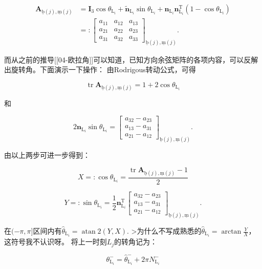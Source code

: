\[
\begin{aligned}
\boldsymbol{A}_{\underline{\mathrm{b}}(j), \underline{\mathrm{m}}(j)} & =\boldsymbol{I}_{3} \cos \theta_{\mathrm{L}_{i}}+\tilde{\boldsymbol{n}}_{\mathrm{L}_{i}} \sin \theta_{\mathrm{L}_{i}}+\boldsymbol{n}_{\mathrm{L}_{i}} \boldsymbol{n}_{\mathrm{L}_{i}}^{\mathrm{T}}\left(1-\cos \theta_{\mathrm{L}_{i}}\right) \\
& =:\left[\begin{array}{lll}
a_{11} & a_{12} & a_{13} \\
a_{21} & a_{22} & a_{23} \\
a_{31} & a_{32} & a_{33}
\end{array}\right]_{\underline{\mathrm{b}}(j), \underline{\mathrm{m}}(j)} .
\end{aligned}
\]

而从之前的推导[[04-欧拉角]]可以知道，已知方向余弦矩阵的各项内容，可以反解出旋转角。下面演示一下操作： 由Rodrigous转动公式，可得

\[
\operatorname{tr} \boldsymbol{A}_{\underline{\mathrm{b}}(j), \underline{\mathrm{m}}(j)}=1+2 \cos \theta_{\mathrm{L}_{i}}
\]

和

\[
2 \boldsymbol{n}_{\mathrm{L}_{i}} \sin \theta_{\mathrm{L}_{i}}=\left[\begin{array}{c}
a_{32}-a_{23} \\
a_{13}-a_{31} \\
a_{21}-a_{12}
\end{array}\right]_{\underline{\mathrm{b}}(j), \underline{\mathrm{m}}(j)} .
\]

由以上两步可进一步得到：

\[
X=:\cos\theta_{\mathrm{L}_{i}}=\frac{\operatorname{tr} \boldsymbol{A}_{\underline{\mathrm{b}}(j), \underline{\mathrm{m}}(j)}-1}{2}
\]

\[
Y=: \sin \theta_{\mathrm{L}_{i}}=\frac{1}{2} \boldsymbol{n}_{\mathrm{L}_{i}}^{\mathrm{T}}\left[\begin{array}{l}
a_{32}-a_{23} \\
a_{13}-a_{31} \\
a_{21}-a_{12}
\end{array}\right]_{\underline{\mathrm{b}}(j), \underline{\mathrm{m}}(j)} .
\]

在$(-\pi,\pi]$区间内有$\hat{\theta}_{\mathrm{L}_{i}}=\operatorname{atan} 2(Y, X) .$
>为什么不写成熟悉的$\hat{\theta}_{\mathrm{L}_{i}}=\arctan \frac{Y}{X}$，这符号我不认识呀。
将上一时刻$L_{j}$的转角记为：

\[
\theta_{\mathrm{L}_{i}}^{-}=\hat{\theta}_{\mathrm{L}_{i}}^{-}+2 \pi N_{\mathrm{L}_{i}}^{-}
\]

